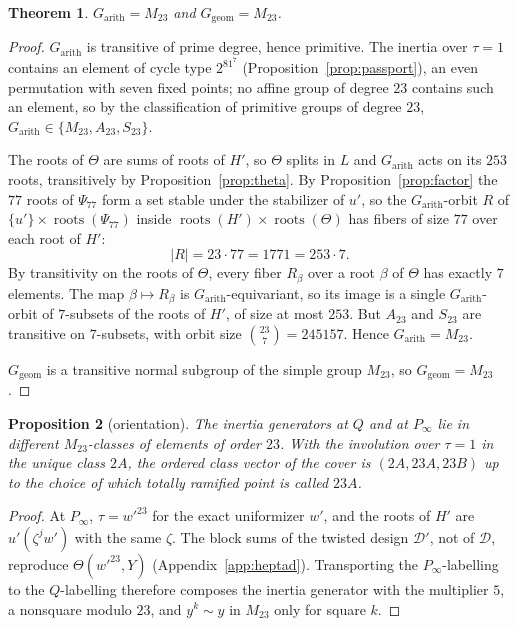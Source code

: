 \documentclass[11pt]{amsart}
\newcommand{\Mtw}{M_{23}}
\newcommand{\Garith}{G_{\mathrm{arith}}}
\newcommand{\Ggeom}{G_{\mathrm{geom}}}
\theoremstyle{plain}
\newtheorem{theorem}{Theorem}[section]
\newtheorem{proposition}[theorem]{Proposition}
\theoremstyle{definition}
\begin{document}
\begin{theorem}\label{thm:mon13}
$\Garith=\Mtw$ and $\Ggeom=\Mtw$.
\end{theorem}
\begin{proof}
$\Garith$ is transitive of prime degree, hence primitive. The inertia
over $\tau=1$ contains an element of cycle type $2^81^7$
(Proposition~\ref{prop:passport}), an even permutation with seven
fixed points; no affine group of degree $23$ contains such an element,
so by the classification of primitive groups of degree $23$,
$\Garith\in\{\Mtw,A_{23},S_{23}\}$.

The roots of $\Theta$ are sums of roots of $H'$, so $\Theta$ splits
in $L$ and $\Garith$ acts on its $253$ roots, transitively by
Proposition~\ref{prop:theta}. By Proposition~\ref{prop:factor} the
$77$ roots of $\Psi_{77}$ form a set stable under the stabilizer of
$u'$, so the $\Garith$-orbit $R$ of
$\{u'\}\times\operatorname{roots}(\Psi_{77})$ inside
$\operatorname{roots}(H')\times\operatorname{roots}(\Theta)$ has
fibers of size $77$ over each root of $H'$:
\[
  |R|=23\cdot77=1771=253\cdot7 .
\]
By transitivity on the roots of $\Theta$, every fiber $R_\beta$ over
a root $\beta$ of $\Theta$ has exactly $7$ elements. The map
$\beta\mapsto R_\beta$ is $\Garith$-equivariant, so its image is a
single $\Garith$-orbit of $7$-subsets of the roots of $H'$, of size at
most $253$. But $A_{23}$ and $S_{23}$ are transitive on $7$-subsets,
with orbit size $\binom{23}{7}=245157$. Hence $\Garith=\Mtw$.

$\Ggeom$ is a transitive normal subgroup of the simple group $\Mtw$,
so $\Ggeom=\Mtw$.
\end{proof}

\begin{proposition}[orientation]\label{prop:orient}
The inertia generators at $Q$ and at $P_\infty$ lie in different
$\Mtw$-classes of elements of order $23$. With the involution over
$\tau=1$ in the unique class $2A$, the ordered class vector of the
cover is $(2A,23A,23B)$ up to the choice of which totally ramified
point is called $23A$.
\end{proposition}
\begin{proof}
At $P_\infty$, $\tau=w'^{23}$ for the exact uniformizer $w'$, and the
roots of $H'$ are $u'(\zeta^jw')$ with the same $\zeta$. The block sums
of the twisted design $\mathcal D'$, not of $\mathcal D$, reproduce
$\Theta(w'^{23},Y)$ (Appendix~\ref{app:heptad}). Transporting the
$P_\infty$-labelling to the $Q$-labelling therefore composes the
inertia generator with the multiplier $5$, a nonsquare modulo $23$,
and $y^k\sim y$ in $\Mtw$ only for square $k$.
\end{proof}
\end{document}
